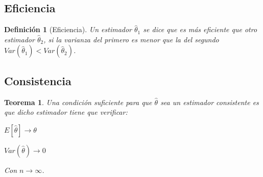 \documentclass[a4paper, 10pt]{article} %
\newtheorem{theorem}{Teorema}[section]
\newtheorem{definition}{Definición}[section]
\begin{document}
\subsection{Eficiencia}
\begin{definition}[Eficiencia]
Un estimador $\hat{\theta}_1$ se dice que es más eficiente que otro estimador $\hat{\theta}_2$, si la varianza del primero es menor que la del segundo $Var(\hat{\theta}_1)<Var(\hat{\theta}_2)$.
\end{definition}

%

\subsection{Consistencia}
\begin{theorem}
Una condición suficiente para que $\hat{\theta}$ sea un estimador consistente es que dicho estimador tiene que verificar:
\begin{description}
\item $E[\hat{\theta}] \rightarrow \theta$
\item $Var(\hat{\theta}) \rightarrow 0$
\end{description}
Con $n \rightarrow \infty$.
\end{theorem}
\end{document}
